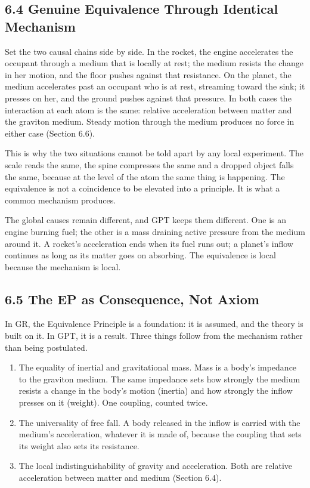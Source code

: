 \documentclass[11pt]{article}
\providecommand{\tightlist}{\setlength{\itemsep}{0pt}\setlength{\parskip}{0pt}}
\begin{document}
\subsection{6.4 Genuine Equivalence Through Identical Mechanism}

Set the two causal chains side by side. In the rocket, the engine accelerates the occupant through a medium that is locally at rest; the medium resists the change in her motion, and the floor pushes against that resistance. On the planet, the medium accelerates past an occupant who is at rest, streaming toward the sink; it presses on her, and the ground pushes against that pressure. In both cases the interaction at each atom is the same: relative acceleration between matter and the graviton medium. Steady motion through the medium produces no force in either case (Section 6.6).

This is why the two situations cannot be told apart by any local experiment. The scale reads the same, the spine compresses the same and a dropped object falls the same, because at the level of the atom the same thing is happening. The equivalence is not a coincidence to be elevated into a principle. It is what a common mechanism produces.

The global causes remain different, and GPT keeps them different. One is an engine burning fuel; the other is a mass draining active pressure from the medium around it. A rocket's acceleration ends when its fuel runs out; a planet's inflow continues as long as its matter goes on absorbing. The equivalence is local because the mechanism is local.

\subsection{6.5 The EP as Consequence, Not Axiom}

In GR, the Equivalence Principle is a foundation: it is assumed, and the theory is built on it. In GPT, it is a result. Three things follow from the mechanism rather than being postulated.

\begin{enumerate}
\def\labelenumi{\arabic{enumi}.}
\tightlist
\item
  The equality of inertial and gravitational mass. Mass is a body's impedance to the graviton medium. The same impedance sets how strongly the medium resists a change in the body's motion (inertia) and how strongly the inflow presses on it (weight). One coupling, counted twice.
\item
  The universality of free fall. A body released in the inflow is carried with the medium's acceleration, whatever it is made of, because the coupling that sets its weight also sets its resistance.
\item
  The local indistinguishability of gravity and acceleration. Both are relative acceleration between matter and medium (Section 6.4).
\end{enumerate}
\end{document}
